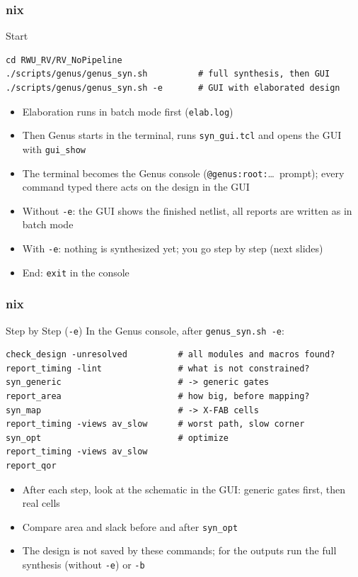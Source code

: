 \documentclass{beamer}
\newcommand{\astitle}{nix}
\newcommand{\assubtitle}{nix}
\newcommand{\cmd}[1]{\texttt{#1}}
\begin{document}
\renewcommand{\assubtitle}{Start}
\begin{frame}[fragile]
\frametitle{\astitle}
\begin{block}{\assubtitle}
  \footnotesize
\begin{lstlisting}[style=sh,basicstyle=\ttfamily\small]
cd RWU_RV/RV_NoPipeline
./scripts/genus/genus_syn.sh          # full synthesis, then GUI
./scripts/genus/genus_syn.sh -e       # GUI with elaborated design
\end{lstlisting}
  \begin{itemize}
    \item Elaboration runs in batch mode first (\cmd{elab.log})
    \item Then Genus starts in the terminal, runs \cmd{syn\_gui.tcl} and
      opens the GUI with \cmd{gui\_show}
    \item The terminal becomes the Genus console (\cmd{@genus:root:}\dots\ prompt);
      every command typed there acts on the design in the GUI
    \item Without \cmd{-e}: the GUI shows the finished netlist, all reports
      are written as in batch mode
    \item With \cmd{-e}: nothing is synthesized yet; you go step by step
      (next slides)
    \item End: \cmd{exit} in the console
  \end{itemize}
\end{block}
\end{frame}

\renewcommand{\assubtitle}{Step by Step (\texttt{-e})}
\begin{frame}[fragile]
\frametitle{\astitle}
\begin{block}{\assubtitle}
  In the Genus console, after \cmd{genus\_syn.sh -e}:
\begin{lstlisting}[style=sh]
check_design -unresolved          # all modules and macros found?
report_timing -lint               # what is not constrained?
syn_generic                       # -> generic gates
report_area                       # how big, before mapping?
syn_map                           # -> X-FAB cells
report_timing -views av_slow      # worst path, slow corner
syn_opt                           # optimize
report_timing -views av_slow
report_qor
\end{lstlisting}
  \begin{itemize}
    \item After each step, look at the schematic in the GUI: generic
      gates first, then real cells
    \item Compare area and slack before and after \cmd{syn\_opt}
    \item The design is not saved by these commands; for the outputs run
      the full synthesis (without \cmd{-e}) or \cmd{-b}
  \end{itemize}
\end{block}
\end{frame}
\end{document}
